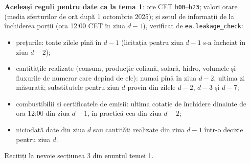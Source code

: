 %
{\textbf{Aceleași reguli pentru date ca la tema 1}: ore CET \texttt{h00}--\texttt{h23}; valori orare (media sferturilor de oră după 1 octombrie 2025);
și setul de informații de la închiderea porții (ora 12:00 CET în ziua $d-1$), verificat de \texttt{ea.leakage\_check}:
\begin{itemize}\setlength{\itemsep}{0pt}
\item prețurile: toate zilele pînă în $d-1$ (licitația pentru ziua $d-1$ s-a încheiat în ziua $d-2$);
\item cantitățile realizate (consum, producție eoliană, solară, hidro, volumele și fluxurile de numerar care depind de ele): numai pînă în ziua $d-2$, ultima zi măsurată; substitutele pentru ziua $d$ provin din zilele $d-2$, $d-3$ și $d-7$;
\item combustibilii și certificatele de emisii: ultima cotație de închidere dinainte de ora 12:00 din ziua $d-1$, în practică cea din ziua $d-2$;
\item niciodată date din ziua $d$ sau cantități realizate din ziua $d-1$ într-o decizie pentru ziua $d$.
\end{itemize}
Recitiți la nevoie secțiunea 3 din enunțul temei 1.}

